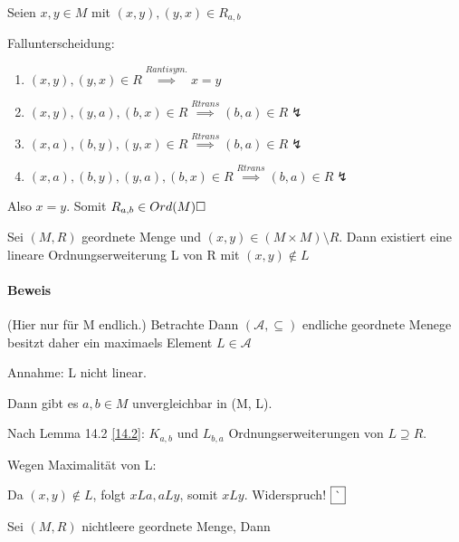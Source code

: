 \documentclass{../../meta/tudscript}
\begin{document}
		        Seien $x,y \in M$ mit $(x,y), (y,x) \in R_{a,b}$
		
		        Fallunterscheidung:
		
		        \begin{enumerate}
		            \item $(x,y), (y,x) \in R \overset{R antisym.}{\implies} x = y$
		            \item $(x,y), (y, a), (b,x) \in R \overset{R trans}{\implies} (b, a) \in R \lightning$
		            \item $(x,a), (b,y), (y,x) \in R \overset{R trans}{\implies} (b,a) \in R \lightning$
		            \item $(x,a), (b,y), (y,a), (b,x) \in R \overset{R trans}{\implies} (b,a) \in R \lightning$
		        \end{enumerate}
		        
		        Also $x = y$. Somit $R_{a, b} \in Ord (M) \hfill\square$
        
        Sei $(M, R)$ geordnete Menge und $(x,y) \in (M \times M) \setminus R$.
        Dann existiert eine lineare Ordnungserweiterung L von R mit $(x,y) \notin L$
		
        \paragraph{Beweis}
            
	        (Hier nur für M endlich.) Betrachte
	        Dann $(\mathscr{A}, \subseteq)$ endliche geordnete Menege besitzt daher ein maximaels
	        Element $L \in \mathscr{A}$
	        
	        Annahme: L nicht linear.
	        
	        Dann gibt es $a, b \in M$ unvergleichbar in (M, L).
	        
	        Nach Lemma 14.2 \ref{14.2}: $K_{a,b}$ und $L_{b,a}$ Ordnungserweiterungen von $L \supseteq R$.
	
	        Wegen Maximalität von L:
	
	        Da $(x,y) \notin L$, folgt $xLa, aLy$, somit $xLy$. Widerspruch! $\hfill\boxed{\lightning}$

       
        Sei $(M,R)$ nichtleere geordnete Menge, Dann
\end{document}
